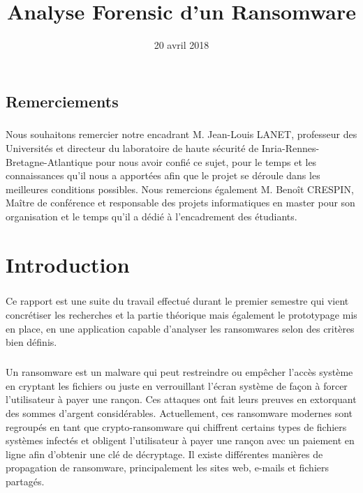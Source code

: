 \documentclass[a4paper, 12pt]{book}
\author{}
\title{Analyse Forensic d'un Ransomware}
\date{20 avril 2018}
\begin{document}
\pagedegarde
\newpage
\pagebreak
\hspace{0pt}
\vfill
\section*{Remerciements}
\paragraph{}
Nous souhaitons remercier notre encadrant M. Jean-Louis  LANET, professeur des Universités et directeur du laboratoire de haute sécurité de Inria-Rennes-Bretagne-Atlantique pour nous avoir confié ce sujet, pour le temps et les connaissances qu'il nous a apportées afin que le projet se déroule dans les meilleures conditions possibles.
Nous remercions également M. Benoît CRESPIN, Maître de conférence et responsable des projets informatiques en master pour son organisation et le temps qu'il a dédié à l'encadrement des étudiants.
\vfill
\hspace{0pt}
\tableofcontents
\listoffigures
\listoftables
\chapter*{Introduction}
\paragraph{}
    Ce rapport est une suite du travail effectué durant le premier semestre qui vient concrétiser les recherches et la partie théorique mais également le prototypage mis en place, en une application capable d'analyser les ransomwares selon des critères bien définis.
\paragraph{}
    Un ransomware est un malware qui peut restreindre ou empêcher l'accès système en cryptant les fichiers ou juste en verrouillant l'écran système de façon à forcer l'utilisateur à payer une rançon. Ces attaques ont fait leurs preuves en extorquant des sommes d'argent considérables. Actuellement, ces ransomware modernes sont regroupés en tant que crypto-ransomware qui chiffrent certains types de fichiers systèmes infectés et obligent l'utilisateur à payer une rançon avec un paiement en ligne afin d'obtenir une clé de décryptage. Il existe différentes manières de propagation de ransomware, principalement les sites web, e-mails et fichiers partagés.
\end{document}
